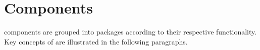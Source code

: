 \newpage
\chapter{\salespoint{} Components}
\salespoint{} components are grouped into packages according to their respective functionality.
Key concepts of \salespoint{} are illustrated in the following paragraphs.











